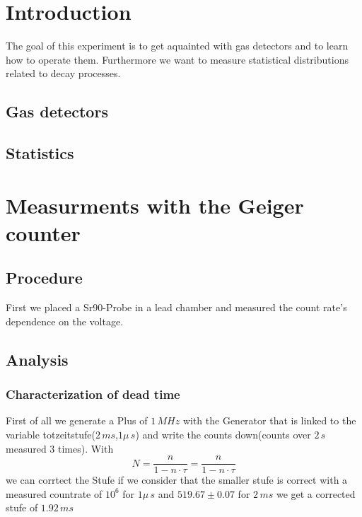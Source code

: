 \tableofcontents
\newpage
\listoffigures

\listoftables

\skippage

\setcounter{page}{1}
\restoregeometry
\thispagestyle{fancy}


\section{Introduction}

The goal of this experiment is to get aquainted with gas detectors and to learn how to operate them. Furthermore we want to measure statistical distributions related to decay processes.

\subsection{Gas detectors}

\subsection{Statistics}

\section{Measurments with the Geiger counter}

\subsection{Procedure}

First we placed a Sr90-Probe in a lead chamber and measured the count rate's dependence on the voltage. 

\subsection{Analysis}

\subsubsection{Characterization of dead time}

First of all we generate a Plus of $1\,MHz$ with the Generator
that is linked to the variable totzeitstufe($2\,ms$,$1\mu\,s$) and write the counts down(counts over $2\,s$ measured $3$ times).
With
\begin{equation}
N =\frac{n}{1-n\cdot\tau}=\frac{n}{1-n\cdot\tau}
\end{equation}
 we can corrtect the Stufe if we consider that the smaller stufe is correct 
with a measured countrate of $10^6$ for $1\mu\,s$ and 
$519.67\pm0.07$ for $2\,ms$ we get a corrected stufe of $1.92\,ms$


